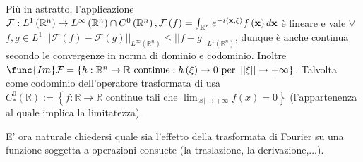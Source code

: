 \documentclass{article}
\begin{document}
Pi\`{u} in astratto, l'applicazione $\mathcal{F}:L^{1}\left( 
\mathbb{R}
^{n}\right) \rightarrow L^{\infty }\left( 
\mathbb{R}
^{n}\right) \cap C^{0}\left( 
\mathbb{R}
^{n}\right) ,\mathcal{F}\left( f\right) =\int_{%
\mathbb{R}
^{n}}e^{-i\left\langle \mathbf{x,\xi }\right\rangle }f\left( \mathbf{x}%
\right) d\mathbf{x}$ \`{e} lineare e vale $\forall $ $f,g\in L^{1}$ $%
\left\vert \left\vert \mathcal{F}\left( f\right) -\mathcal{F}\left( g\right)
\right\vert \right\vert _{L^{\infty }\left( 
\mathbb{R}
^{n}\right) }\leq \left\vert \left\vert f-g\right\vert \right\vert
_{L^{1}\left( 
\mathbb{R}
^{n}\right) }$, dunque \`{e} anche continua secondo le convergenze in norma
di dominio e codominio. Inoltre $\func{Im}\mathcal{F}=\left\{ h:%
\mathbb{R}
^{n}\rightarrow 
\mathbb{R}
\text{ continue}:h\left( \xi \right) \rightarrow 0\text{ per }\left\vert
\left\vert \xi \right\vert \right\vert \rightarrow +\infty \right\} $.
Talvolta come codominio dell'operatore trasformata di usa $C_{\ast
}^{0}\left( 
\mathbb{R}
\right) :=\left\{ f:%
\mathbb{R}
\rightarrow 
\mathbb{R}
\text{ continue tali che }\lim_{\left\vert x\right\vert \rightarrow +\infty
}f\left( x\right) =0\right\} $ (l'appartenenza al quale implica la
limitatezza).

E' ora naturale chiedersi quale sia l'effetto della trasformata di Fourier
su una funzione soggetta a operazioni consuete (la traslazione, la
derivazione,...).
\end{document}
